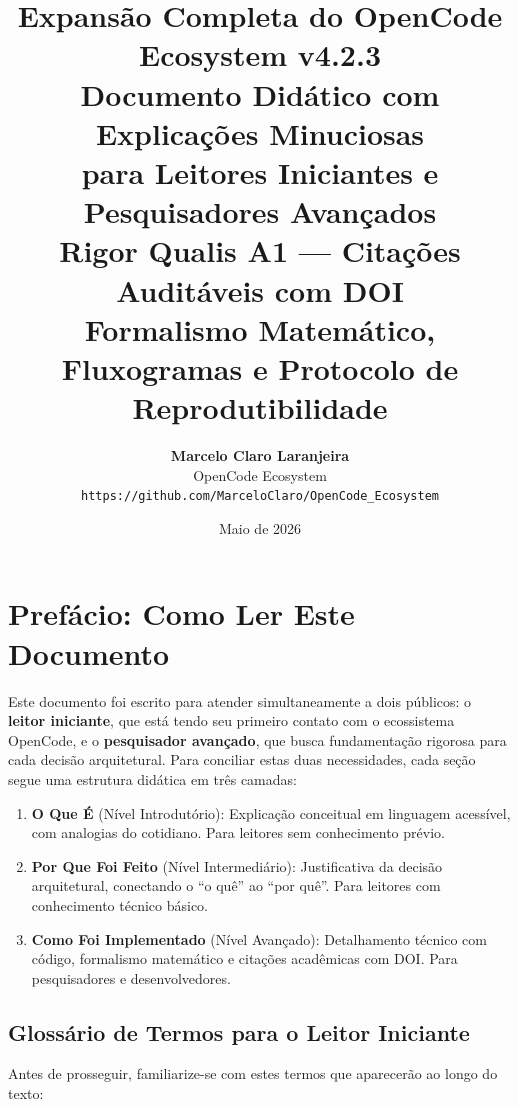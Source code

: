 \documentclass[12pt,a4paper]{article}
\title{\textbf{Expansão Completa do OpenCode Ecosystem v4.2.3}\\[6pt]
       \large Documento Didático com Explicações Minuciosas\\
       para Leitores Iniciantes e Pesquisadores Avançados\\[8pt]
       \normalsize Rigor Qualis A1 --- Citações Auditáveis com DOI\\
       Formalismo Matemático, Fluxogramas e Protocolo de Reprodutibilidade}
\author{\textbf{Marcelo Claro Laranjeira}\\[4pt]
        \small OpenCode Ecosystem\\
        \texttt{https://github.com/MarceloClaro/OpenCode\_Ecosystem}}
\date{Maio de 2026}
\begin{document}
\maketitle

\section{Prefácio: Como Ler Este Documento}

Este documento foi escrito para atender simultaneamente a dois públicos: o \textbf{leitor iniciante}, que está tendo seu primeiro contato com o ecossistema OpenCode, e o \textbf{pesquisador avançado}, que busca fundamentação rigorosa para cada decisão arquitetural. Para conciliar estas duas necessidades, cada seção segue uma estrutura didática em três camadas:

\begin{enumerate}[itemsep=2pt]
  \item \textbf{O Que É} (Nível Introdutório): Explicação conceitual em linguagem acessível, com analogias do cotidiano. Para leitores sem conhecimento prévio.
  \item \textbf{Por Que Foi Feito} (Nível Intermediário): Justificativa da decisão arquitetural, conectando o ``o quê'' ao ``por quê''. Para leitores com conhecimento técnico básico.
  \item \textbf{Como Foi Implementado} (Nível Avançado): Detalhamento técnico com código, formalismo matemático e citações acadêmicas com DOI. Para pesquisadores e desenvolvedores.
\end{enumerate}

\subsection*{Glossário de Termos para o Leitor Iniciante}

Antes de prosseguir, familiarize-se com estes termos que aparecerão ao longo do texto:
\end{document}
